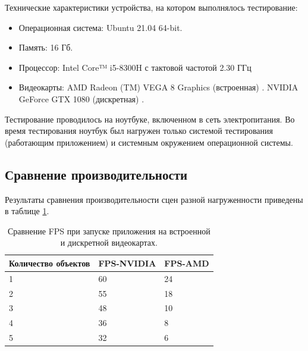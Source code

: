 Технические характеристики устройства, на котором выполнялось тестирование:

\begin{itemize}[label=---]
	\item Операционная система: Ubuntu 21.04 \cite{ubuntu} 64-bit.
	\item Память: 16 Гб.
	\item Процессор: Intel Core™ i5-8300H \cite{intel} с тактовой частотой  2.30 ГГц
	\item Видеокарты: 
	\subitem AMD Radeon (TM) VEGA 8 Graphics (встроенная) \cite{amd-graphics}.
	\subitem NVIDIA GeForce GTX 1080 (дискретная) \cite{nvidia-graphics}.
\end{itemize}

Тестирование проводилось на ноутбуке, включенном в сеть электропитания. Во время тестирования ноутбук был нагружен только системой тестирования (работающим приложением) и системным окружением операционной системы.

\subsection{Сравнение производительности}

Результаты сравнения производительности сцен разной нагруженности приведены в таблице \ref{tb:comp_fps}.
\begin{table}[h]
	\caption{Сравнение FPS при запуске приложения на встроенной и дискретной видеокартах.}
	\begin{tabular}{|l|l|l|}
		\hline
		Количество объектов & FPS-NVIDIA & FPS-AMD \\
		\hline
		1                   & 60         & 24        \\
		2                   & 55         & 18        \\
		3                   & 48         & 10        \\
		4                   & 36         & 8        \\
		5                   & 32         & 6         \\
		\hline
	\end{tabular}
	\label{tb:comp_fps}
\end{table}

\clearpage

